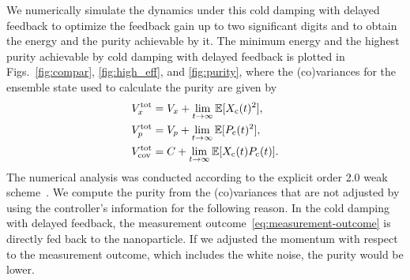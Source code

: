 \documentclass[aps,pra,superscriptaddress,twocolumn
]{revtex4-2}
\newcommand{\majrev}[1]{{#1}}
\begin{document}
{We numerically simulate the dynamics under this cold damping with delayed feedback 
to optimize the feedback gain up to two significant digits and 
to obtain the energy and the purity achievable by it.
The minimum energy and the highest purity achievable by cold damping with delayed feedback
 is plotted in Figs.~\ref{fig:compar}, \ref{fig:high_eff}, and \ref{fig:purity}, 
 {where the (co)variances for the ensemble state used to 
 calculate the purity are given by 
 \begin{alignat}{1}
  V_x^{\rm tot} &= V_x + \lim_{t\to \infty} \mathbb{E}[X_{\rm c}(t)^2] ,\\ 
  V_p^{\rm tot} &=  V_p + \lim_{t\to \infty} \mathbb{E}[P_{\rm c}(t)^2],\\
  V_{\rm cov}^{\rm tot} &=  C + \lim_{t\to \infty} \mathbb{E}[X_{\rm c}(t) P_{\rm c} (t)].
 \end{alignat} }
The numerical analysis was conducted 
according to the explicit order 2.0 weak scheme~\cite{kloeden2013numerical}.
\majrev{We compute the purity from the (co)variances 
that are not adjusted by using the controller's information 
for the following reason.
In the cold damping with delayed feedback, 
the measurement outcome~\eqref{eq:measurement-outcome}
is directly fed back to the nanoparticle.
If we adjusted the momentum with respect to the measurement outcome, 
which includes the white noise, the purity would be lower.}


}


 



\end{document}
